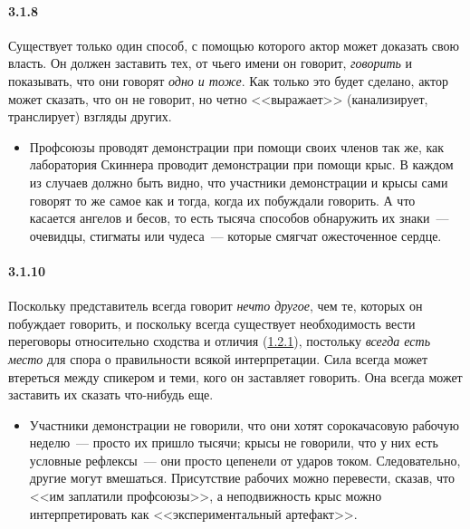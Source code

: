 \paragraph{3.1.8}\hypertarget{par:3.1.8}{} Существует только один способ, с помощью которого актор может доказать свою власть. Он должен заставить тех, от чьего имени он говорит, {\itshape говорить} и показывать, что они говорят {\itshape одно и тоже}. Как только это будет сделано, актор может сказать, что он не говорит, но четно <<выражает>> (канализирует, транслирует) взгляды других. 
	\begin{itemize}
	\item 
	Профсоюзы проводят демонстрации при помощи своих членов так же, как лаборатория Скиннера проводит демонстрации при помощи крыс. В каждом из случаев должно быть видно, что участники демонстрации и крысы сами говорят то же самое как и тогда, когда их побуждали говорить. А что касается ангелов и бесов, то есть тысяча способов обнаружить их знаки~--- очевидцы, стигматы или чудеса~--- которые смягчат  ожесточенное сердце.
	\end{itemize}


\paragraph{3.1.10}\hypertarget{par:3.1.10}{} Поскольку представитель всегда говорит {\itshape нечто другое}, чем те, которых он побуждает говорить, и поскольку всегда существует необходимость вести переговоры относительно сходства и отличия (\hyperlink{par:1.2.1}{1.2.1}), постольку {\itshape всегда есть место} для спора о правильности всякой интерпретации. Сила всегда может втереться между спикером и теми, кого он заставляет говорить. Она всегда может заставить их сказать что-нибудь еще. 
	\begin{itemize}
	\item 
	Участники демонстрации не говорили, что они хотят сорокачасовую рабочую неделю~--- просто их пришло тысячи; крысы не говорили, что у них есть условные рефлексы~--- они просто цепенели от ударов током. Следовательно, другие могут вмешаться. Присутствие рабочих можно перевести, сказав, что <<им заплатили профсоюзы>>, а неподвижность крыс можно интерпретировать как <<экспериментальный артефакт>>.
	\end{itemize}

